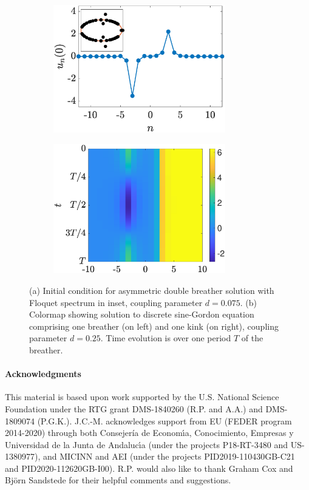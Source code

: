 \documentclass[12pt,reqno]{amsart}
\theoremstyle{definition}
\begin{document}
\begin{figure}
	\begin{center}
	\begin{subfigure}{0.45\linewidth}
		\caption{}
		\includegraphics[width=7.5cm]{images/doubleasymm.eps} 
		\label{fig:brka} 
	\end{subfigure}
	\begin{subfigure}{0.45\linewidth}
		\caption{}
		\includegraphics[width=7.5cm]{images/brk1colormap.eps} 
		\label{fig:brkb} 
	\end{subfigure}
	\end{center}
	\caption{(a) Initial condition for asymmetric double breather solution with Floquet spectrum in inset, coupling parameter $d = 0.075$. (b) Colormap showing solution to discrete sine-Gordon equation comprising one breather (on left) and one kink (on right), coupling parameter $d = 0.25$. Time evolution is over one period $T$ of the breather.}
	\label{fig:brk}
\end{figure}

\vspace{0.5cm}

\paragraph{\textbf{Acknowledgments}}

This material is based upon work supported by the U.S. National Science Foundation under the RTG grant DMS-1840260 (R.P. and A.A.) and DMS-1809074 (P.G.K.). J.C.-M. acknowledges support from EU (FEDER program 2014-2020) through both Consejería de Econom\'{\i}a, Conocimiento, Empresas y Universidad de la Junta de Andaluc\'{\i}a (under the projects P18-RT-3480 and US-1380977), and MICINN and AEI (under the projects PID2019-110430GB-C21 and PID2020-112620GB-I00). R.P. would also like to thank Graham Cox and Bj\"orn Sandstede for their helpful comments and suggestions.
\end{document}
